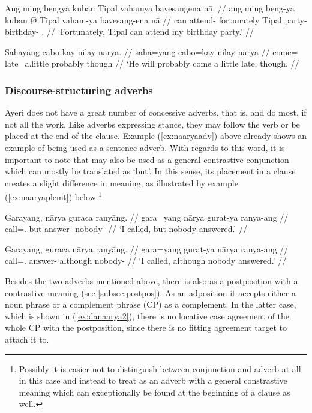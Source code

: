 \pex\label{ex:stanceadv}
\a \begingl
	\gla Ang ming bengya kuban {} Tipal vahamya bavesangena nā. //
	\glb ang ming beng-ya kuban Ø Tipal vaham-ya bavesang-ena nā //
	\glc \AgtT{} can attend-\TsgM{} fortunately \Top{} Tipal party-\Loc{} 
		birthday-\Gen{} \Fsg{}.\Gen{} //
	\glft `Fortunately, Tipal can attend my birthday party.' //
\endgl

\a\label{ex:naaryaadv} \begingl
	\gla Sahayāng cabo-kay nilay nārya. //
	\glb saha=yāng cabo=kay nilay nārya //
	\glc come=\TsgM{} late=a.little probably though //
	\glft `He will probably come a little late, though. //
\endgl
\xe

\subsubsection{Discourse-structuring adverbs}
\label{subsubsec:discourseadv}

Ayeri does not have a great number of concessive adverbs, that is,
 and  do most, if not all the work. Like adverbs expressing stance,
they may follow the verb or be placed at the end of the clause. Example
(\ref{ex:naaryaadv}) above already shows an example of 
being used as a sentence adverb. With regards to this word, it is important to
note that  may also be used as a general contrastive
conjunction which can mostly be translated as `but'. In this sense, its
placement in a clause creates a slight difference in meaning, as illustrated
by example (\ref{ex:naaryaplcmt}) below.\footnote{Possibly it is easier not to
distinguish between conjunction and adverb at all in this case and instead to
treat  as an adverb with a general constrastive meaning
which can exceptionally be found at the beginning of a clause as
well.\label{fn:naaryapos}}

\pex\label{ex:naaryaplcmt}
\a\label{ex:naaryaconj}\begingl
	\gla Garayang, nārya guraca ranyāng. //
	\glb gara=yang nārya gurat-ya ranya-ang //
	\glc call=\Fsg{}.\Aarg{} but answer-\TsgM{} nobody-\Aarg{} //
	\glft `I called, but nobody answered.' //
\endgl

\a\label{ex:naaryaadv2}\begingl
	\gla Garayang, guraca nārya ranyāng. //
	\glb gara=yang gurat-ya nārya ranya-ang //
	\glc call=\Fsg{}.\Aarg{} answer-\TsgM{} although nobody-\Aarg{} //
	\glft `I called, although nobody answered.' //
\endgl

\xe

Besides the two adverbs mentioned above, there is also
 as a postposition
with a contrastive meaning (see \autoref{subsec:postpos}). As an adposition it
accepts either a noun phrase or a complement phrase (CP) as a complement. In
the latter case, which is shown in (\ref{ex:danaarya2}), there is no locative
case agreement of the whole CP with the postposition, since there is no fitting
agreement target to attach it to.

